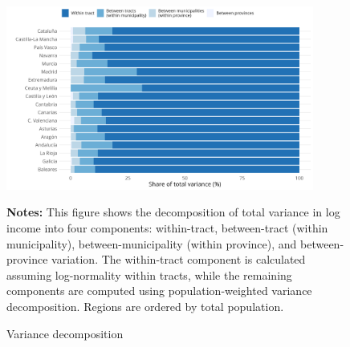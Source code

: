 \begin{figure}[H]
\begin{center}
\captionsetup{justification=centering}
\caption{Variance decomposition}
\label{fig:variance_decomp}
\includegraphics[width=0.9\textwidth]{output/variance_decomp.png}
\end{center}
\begin{fignotes2}
\textbf{Notes:} This figure shows the decomposition of total variance in log income into four components: within-tract, between-tract (within municipality), between-municipality (within province), and between-province variation. The within-tract component is calculated assuming log-normality within tracts, while the remaining components are computed using population-weighted variance decomposition. Regions are ordered by total population. 
\end{fignotes2}
\end{figure}